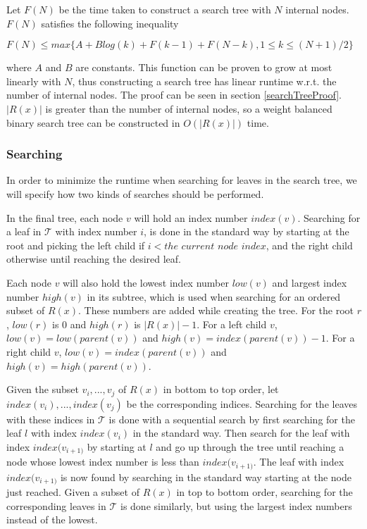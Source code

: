 Let $F(N)$ be the time taken to construct a search tree with $N$ internal nodes. $F(N)$ satisfies the following inequality

$F(N) \le max\{A + Blog(k) + F(k-1) + F(N-k), 1 \le k \le (N+1)/2\}$

where $A$ and $B$ are constants. This function can be proven to grow at most linearly with $N$, thus constructing a search tree has linear runtime w.r.t. the number of internal nodes. The proof can be seen in section \ref{searchTreeProof}. $|R(x)|$ is greater than the number of internal nodes, so a weight balanced binary search tree can be constructed in $O(|R(x)|)$ time.

\subsubsection{Searching}
\label{st_searching}
In order to minimize the runtime when searching for leaves in the search tree, we will specify how two kinds of searches should be performed.

In the final tree, each node $v$ will hold an index number $index(v)$. Searching for a leaf in $\mathcal{T}$ with index number $i$, is done in the standard way by starting at the root and picking the left child if $i < the$ $current$ $node$ $index$, and the right child otherwise until reaching the desired leaf.

Each node $v$ will also hold the lowest index number $low(v)$ and largest index number $high(v)$ in its subtree, which is used when searching for an ordered subset of $R(x)$. These numbers are added while creating the tree. For the root $r$, $low(r)$ is 0 and $high(r)$ is $|R(x)|-1$. For a left child $v$, $low(v)=low(parent(v))$ and $high(v)=index(parent(v))-1$. For a right child $v$, $low(v)=index(parent(v))$ and $high(v)=high(parent(v))$.

Given the subset ${v_i, ..., v_j}$ of $R(x)$ in bottom to top order, let ${index(v_i), ..., index(v_j)}$ be the corresponding indices. Searching for the leaves with these indices in $\mathcal{T}$ is done with a sequential search by first searching for the leaf $l$ with index $index(v_i)$ in the standard way. Then search for the leaf with index $index(v_{i+1)}$ by starting at $l$ and go up through the tree until reaching a node whose lowest index number is less than $index(v_{i+1)}$. The leaf with index $index(v_{i+1)}$ is now found by searching in the standard way starting at the node just reached. Given a subset of $R(x)$ in top to bottom order, searching for the corresponding leaves in $\mathcal{T}$ is done similarly, but using the largest index numbers instead of the lowest.

